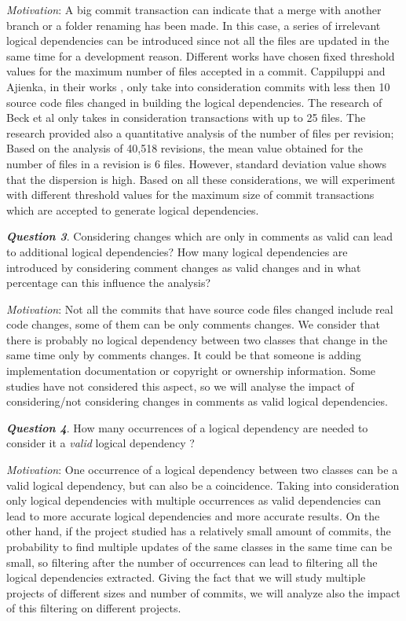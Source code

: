 \documentclass[a4paper,twoside]{article}
\begin{document}
\textit{Motivation}: A big commit transaction can indicate that a merge with another branch or a folder renaming has been made. In this case, a series of irrelevant logical dependencies can be introduced since not all the files are updated in the same time for a development reason. Different works have chosen fixed threshold values for the maximum number of files accepted in a commit. Cappiluppi and Ajienka, in their works \cite{DBLP:journals/jss/AjienkaC17}, \cite{DBLP:journals/ese/AjienkaCC18} only take into consideration commits with less then 10 source code files changed in building the logical dependencies. The research of Beck et al \cite{Beck:2011:CMC:2025113.2025162} only takes in consideration transactions with up to 25 files. The research \cite{Oliva:2011:ISL:2067853.2068086} provided also a quantitative analysis of the number of files per revision; Based on the analysis of  40,518 revisions, the mean value obtained for the number of files in a revision is 6 files. However, standard deviation value shows that the dispersion is high. Based on all these considerations, we will experiment with different threshold values for the maximum size of commit transactions which are accepted to generate logical dependencies.


\textit{\textbf{Question 3}}. Considering changes which are only in comments as valid can lead to additional logical dependencies? How many logical dependencies are introduced by considering comment changes as valid changes and in what percentage can this influence the analysis?

\textit{Motivation}: Not all the commits that have source code files changed include real code changes, some of them can be only comments changes. We consider that there is probably no logical dependency between two classes that change in the same time only by comments changes. It could be that someone is adding implementation documentation or copyright or ownership information. Some studies have not considered this aspect, so we will analyse the impact of considering/not considering changes in  comments as valid logical dependencies. 


\textit{\textbf{Question 4}}. How many occurrences of a logical dependency are needed to consider it a \textit{valid} logical dependency ? 

\textit{Motivation}: One occurrence of a logical dependency between two classes can be a valid logical dependency, but can also be a coincidence. Taking into consideration only logical dependencies with multiple occurrences as valid dependencies can lead to more accurate logical dependencies and more accurate results. On the other hand, if the project studied has a relatively small amount of commits, the probability to find multiple updates of the same classes in the same time can be small, so filtering after the number of occurrences can lead to filtering all the logical dependencies extracted. Giving the fact that we will study multiple projects of different sizes and number of commits, we will analyze also the impact of this filtering on different projects.
\end{document}
